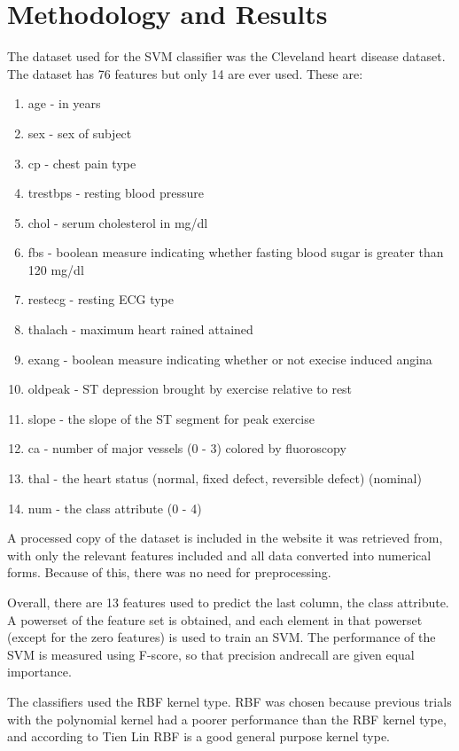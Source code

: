 \documentclass[conference]{IEEEtran}
\begin{document}
\section{Methodology and Results}
	The dataset used for the SVM classifier was the Cleveland heart disease dataset.
	The dataset has 76 features but only 14 are ever used. These are:
	\begin{enumerate}[start=0]
	  \item age - in years
      \item sex - sex of subject     
      \item cp - chest pain type
      \item trestbps - resting blood pressure
      \item chol - serum cholesterol in mg/dl
	  \item fbs - boolean measure indicating whether fasting blood sugar is greater than 120 mg/dl
      \item restecg - resting ECG type
      \item thalach - maximum heart rained attained
      \item exang - boolean measure indicating whether or not execise induced angina
      \item oldpeak - ST depression brought by exercise relative to rest
      \item slope - the slope of the ST segment for peak exercise
	  \item ca - number of major vessels (0 - 3) colored by fluoroscopy        
      \item thal - the heart status (normal, fixed defect, reversible defect) (nominal) 
	  \item num - the class attribute (0 - 4) 
	\end{enumerate}
	A processed copy of the dataset is included in the website it was retrieved from, with only the relevant features included and all data converted into numerical forms.
	Because of this, there was no need for preprocessing.

	Overall, there are 13 features used to predict the last column, the class attribute.
	A powerset of the feature set is obtained, and each element in that powerset (except for the zero features) is used to train an SVM.
	The performance of the SVM is measured using F-score, so that precision andrecall are given equal importance.

	The classifiers used the RBF kernel type.
	RBF was chosen because previous trials with the polynomial kernel had a poorer performance than the RBF kernel type, and according to Tien Lin \cite{bib:rbf} RBF is a good general purpose kernel type.
\end{document}
